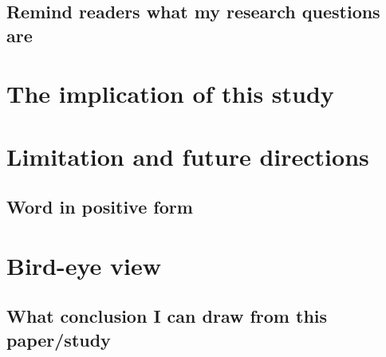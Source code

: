 \documentclass[a4paper,11pt,UKenglish,twoside,openright]{report}\usepackage[]{graphicx}\usepackage[]{color}
\begin{document}
\subsection{Remind readers what my research questions are}

\section{The implication of this study}

\section{Limitation and future directions}

\subsection{Word in positive form}

\section{Bird-eye view}

\subsection{What conclusion I can draw from this paper/study}

\newpage
\printbibliography[title=References]





\begin{appendices}
    
    \begin{singlespace}
    
    \end{singlespace}
    
%    
%    
%    
    
\end{appendices}

\cleardoublepage
{}
{}
\printindex[a]

\cleardoublepage
{}
{}
\printindex
\end{document}
